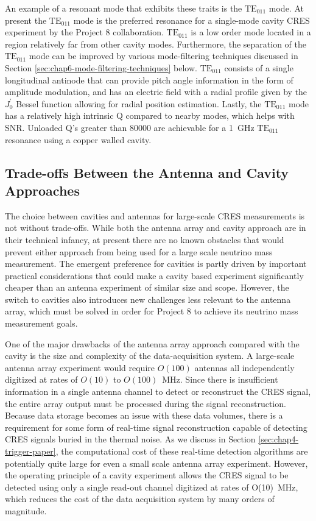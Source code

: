 An example of a resonant mode that exhibits these traits is the $\mathrm{TE}_{011}$ mode. At present the $\mathrm{TE}_{011}$ mode is the preferred resonance for a single-mode cavity CRES experiment by the Project 8 collaboration. $\mathrm{TE}_{011}$ is a low order mode located in a region relatively far from other cavity modes. Furthermore, the separation of the $\mathrm{TE}_011$ mode can be improved by various mode-filtering techniques discussed in Section \ref{sec:chap6-mode-filtering-techniques} below. $\mathrm{TE}_{011}$ consists of a single longitudinal antinode that can provide pitch angle information in the form of amplitude modulation, and has an electric field with a radial profile given by the $J_0^\prime$ Bessel function allowing for radial position estimation. Lastly, the $\mathrm{TE}_{011}$ mode has a relatively high intrinsic Q compared to nearby modes, which helps with SNR. Unloaded Q's greater than 80000 are achievable for a 1~GHz $\mathrm{TE}_{011}$ resonance using a copper walled cavity. 

\subsection{Trade-offs Between the Antenna and Cavity Approaches}

The choice between cavities and antennas for large-scale CRES measurements is not without trade-offs. While both the antenna array and cavity approach are in their technical infancy, at present there are no known obstacles that would prevent either approach from being used for a large scale neutrino mass measurement. The emergent preference for cavities is partly driven by important practical considerations that could make a cavity based experiment significantly cheaper than an antenna experiment of similar size and scope. However, the switch to cavities also introduces new challenges less relevant to the antenna array, which must be solved in order for Project 8 to achieve its neutrino mass measurement goals. 

One of the major drawbacks of the antenna array approach compared with the cavity is the size and complexity of the data-acquisition system. A large-scale antenna array experiment would require $O(100)$ antennas all independently digitized at rates of $O(10)$ to $O(100)$~MHz. Since there is insufficient information in a single antenna channel to detect or reconstruct the CRES signal, the entire array output must be processed during the signal reconstruction. Because data storage becomes an issue with these data volumes, there is a requirement for some form of real-time signal reconstruction capable of detecting CRES signals buried in the thermal noise. As we discuss in Section \ref{sec:chap4-trigger-paper}, the computational cost of these real-time detection algorithms are potentially quite large for even a small scale antenna array experiment. However, the operating principle of a cavity experiment allows the CRES signal to be detected using only a single read-out channel digitized at rates of O(10)~MHz, which reduces the cost of the data acquisition system by many orders of magnitude.

